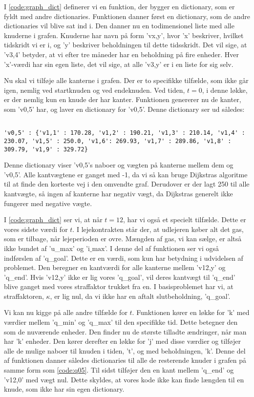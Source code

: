 I \autoref{code:graph_dict} definerer vi en funktion, der bygger en dictionary, som er fyldt med andre dictionaries. Funktionen danner først en dictionary, som de andre dictionaries vil blive sat ind i.
Den danner nu en todimensionel liste med alle knuderne i grafen. Knuderne har navn på form 'vx,y', hvor 'x' beskriver, hvilket tidskridt vi er i, og 'y' beskriver beholdningen til dette tidsskridt. Det vil sige, at 'v3,4' betyder, at vi efter tre måneder har en beholdning på fire enheder. Hver 'x'-værdi har sin egen liste, det vil sige, at alle 'v3,y' er i en liste for sig selv.

Nu skal vi tilføje alle kanterne i grafen. Der er to specifikke tilfælde, som ikke går igen, nemlig ved startknuden og ved endeknuden. Ved tiden, $t=0$, i denne løkke, er der nemlig kun en knude der har kanter. Funktionen genererer nu de kanter, som 'v0,5' har, og laver en dictionary for 'v0,5'. 
Denne dictionary ser ud således:

\begin{lstlisting}[label=code:q05, caption=Dictionary for '$\textrm{v0,5}$'.]

'v0,5' : {'v1,1' : 170.28, 'v1,2' : 190.21, 'v1,3' : 210.14, 'v1,4' : 230.07, 'v1,5' : 250.0, 'v1,6': 269.93, 'v1,7' : 289.86, 'v1,8' : 309.79, 'v1,9' : 329.72}
\end{lstlisting}
Denne dictionary viser 'v0,5's naboer og vægten på kanterne mellem dem og 'v0,5'. Alle kantvægtene er ganget med -1, da vi så kan bruge Dijkstras algoritme til at finde den korteste vej i den omvendte graf. Derudover er der lagt 250 til alle kantvægte, så ingen af kanterne har negativ vægt, da Dijkstras generelt ikke fungerer med negative vægte. 

I \autoref{code:graph_dict} ser vi, at når $t=12$, har vi også et specielt tilfælde. Dette er vores sidste værdi for $t$. I lejekontrakten står der, at udlejeren køber alt det gas, som er tilbage, når lejeperioden er ovre. Mængden af gas, vi kan sælge, er altså ikke bundet af 'u\_max' og '$\textrm{i\_max}$'. I denne del af funktionen ser vi også indførslen af 'q\_goal'. Dette er en værdi, som kun har betydning i udvidelsen af problemet. Den beregner en kantværdi for alle kanterne mellem 'v12,y' og 'q\_end'. Hvis 'v12,y' ikke er lig vores 'q\_goal', vil deres kantvægt til 'q\_end' blive ganget med vores straffaktor trukket fra en. I basisproblemet har vi, at straffaktoren, $\kappa$, er lig nul, da vi ikke har en aftalt slutbeholdning, 'q\_goal'.

Vi kan nu kigge på alle andre tilfælde for $t$. Funktionen kører en løkke for 'k' med værdier mellem 'q\_min' og 'q\_max' til den specifikke tid. Dette betegner den som de nuværende enheder.
Den finder nu de største tilladte ændringer, når man har 'k' enheder. Den kører derefter en løkke for 'j' med disse værdier og tilføjer alle de mulige naboer til knuden i tiden, 't', og med beholdningen, 'k'. Denne del af funktionen danner således dictionaries til alle de resterende knuder i grafen på samme form som \autoref{code:q05}.
Til sidst tilføjer den en kant mellem 'q\_end' og 'v12,0' med vægt nul. Dette skyldes, at vores kode ikke kan finde længden til en knude, som ikke har sin egen dictionary.

